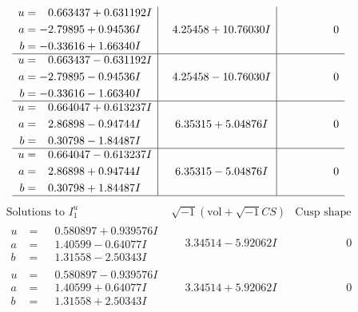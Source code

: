 \documentclass[1p]{elsarticle_modified}
\theoremstyle{definition}
\newcommand{\I}{\sqrt{-1}}
\begin{document}
$$\begin{array}{c|c|c}
\begin{aligned}
u &= \phantom{-}0.663437 + 0.631192 I \\
a &= -2.79895 + 0.94536 I \\
b &= -0.33616 + 1.66340 I\end{aligned}
 & \phantom{-}4.25458 + 10.76030 I & \phantom{-0.000000 } 0 \\ \hline\begin{aligned}
u &= \phantom{-}0.663437 - 0.631192 I \\
a &= -2.79895 - 0.94536 I \\
b &= -0.33616 - 1.66340 I\end{aligned}
 & \phantom{-}4.25458 - 10.76030 I & \phantom{-0.000000 } 0 \\ \hline\begin{aligned}
u &= \phantom{-}0.664047 + 0.613237 I \\
a &= \phantom{-}2.86898 - 0.94744 I \\
b &= \phantom{-}0.30798 - 1.84487 I\end{aligned}
 & \phantom{-}6.35315 + 5.04876 I & \phantom{-0.000000 } 0 \\ \hline\begin{aligned}
u &= \phantom{-}0.664047 - 0.613237 I \\
a &= \phantom{-}2.86898 + 0.94744 I \\
b &= \phantom{-}0.30798 + 1.84487 I\end{aligned}
 & \phantom{-}6.35315 - 5.04876 I & \phantom{-0.000000 } 0\\
 \hline 
 \end{array}$$\newpage$$\begin{array}{c|c|c}  
\text{Solutions to }I^u_{1}& \I (\text{vol} + \sqrt{-1}CS) & \text{Cusp shape}\\
 \hline 
\begin{aligned}
u &= \phantom{-}0.580897 + 0.939576 I \\
a &= \phantom{-}1.40599 - 0.64077 I \\
b &= \phantom{-}1.31558 - 2.50343 I\end{aligned}
 & \phantom{-}3.34514 - 5.92062 I & \phantom{-0.000000 } 0 \\ \hline\begin{aligned}
u &= \phantom{-}0.580897 - 0.939576 I \\
a &= \phantom{-}1.40599 + 0.64077 I \\
b &= \phantom{-}1.31558 + 2.50343 I\end{aligned}
 & \phantom{-}3.34514 + 5.92062 I & \phantom{-0.000000 } 0 \\ \hline\begin{aligned}

\end{aligned}
\end{array}$$
\end{document}
